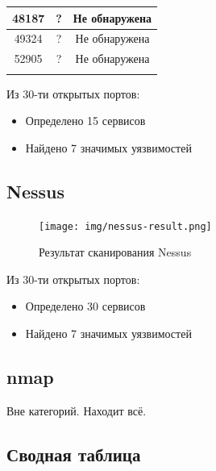 \begin{table}[H]
\begin{tabular}{ccc}
		\multicolumn{1}{|c|}{48187} & \multicolumn{1}{c|}{?}                           & \multicolumn{1}{c|}{Не обнаружена}                   \\ \hline
		\multicolumn{1}{|c|}{49324} & \multicolumn{1}{c|}{?}                           & \multicolumn{1}{c|}{Не обнаружена}                   \\ \hline
		\multicolumn{1}{|c|}{52905} & \multicolumn{1}{c|}{?}                           & \multicolumn{1}{c|}{Не обнаружена}                   \\ \hline
		\multicolumn{1}{l}{}        & \multicolumn{1}{l}{}                             & \multicolumn{1}{l}{}                                
	\end{tabular}
\end{table}



Из 30-ти открытых портов:

\begin{itemize}
	\item Определено 15 сервисов
	\item Найдено 7 значимых уязвимостей
\end{itemize}


\subsection{Nessus}

\begin{figure}[H]
	\centering
	\caption{Результат сканирования Nessus}
	\texttt{[image: img/nessus-result.png]}
\end{figure}

Из 30-ти открытых портов:

\begin{itemize}
	\item Определено 30 сервисов
	\item Найдено 7 значимых уязвимостей
\end{itemize}

\subsection{nmap}

Вне категорий. Находит всё.




\subsection{Сводная таблица}

